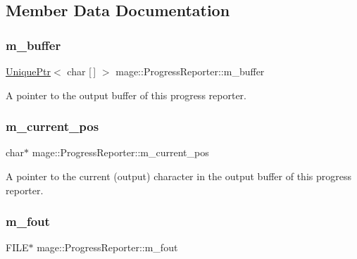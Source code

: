 \subsection{Member Data Documentation}
\hypertarget{classmage_1_1_progress_reporter_a725763db34f5bbb7408107d55ee43beb}{}\label{classmage_1_1_progress_reporter_a725763db34f5bbb7408107d55ee43beb} 
\subsubsection{\texorpdfstring{m\+\_\+buffer}{m\_buffer}}
{\footnotesize\ttfamily \hyperlink{namespacemage_a3316d7143a973e37adf1110f2e80ca31}{Unique\+Ptr}$<$ char \mbox{[}$\,$\mbox{]} $>$ mage\+::\+Progress\+Reporter\+::m\+\_\+buffer\hspace{0.3cm}{\ttfamily [private]}}

A pointer to the output buffer of this progress reporter. \hypertarget{classmage_1_1_progress_reporter_a7adafaaf90edf29c8c27f4008aea41c9}{}\label{classmage_1_1_progress_reporter_a7adafaaf90edf29c8c27f4008aea41c9} 
\subsubsection{\texorpdfstring{m\+\_\+current\+\_\+pos}{m\_current\_pos}}
{\footnotesize\ttfamily char$\ast$ mage\+::\+Progress\+Reporter\+::m\+\_\+current\+\_\+pos\hspace{0.3cm}{\ttfamily [private]}}

A pointer to the current (output) character in the output buffer of this progress reporter. \hypertarget{classmage_1_1_progress_reporter_ad325ee5978fd1d16a97acbe37a977982}{}\label{classmage_1_1_progress_reporter_ad325ee5978fd1d16a97acbe37a977982} 
\subsubsection{\texorpdfstring{m\+\_\+fout}{m\_fout}}
{\footnotesize\ttfamily F\+I\+LE$\ast$ mage\+::\+Progress\+Reporter\+::m\+\_\+fout\hspace{0.3cm}{\ttfamily [private]}}

